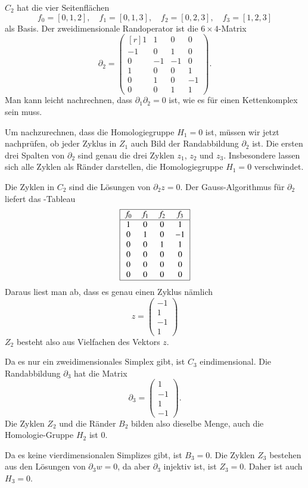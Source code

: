 \begin{beispiel}
$C_2$ hat die vier Seitenflächen
\[
f_0=[0,1,2],\quad
f_1=[0,1,3],\quad
f_2=[0,2,3],\quad
f_3=[1,2,3]
\]
als Basis.
Der zweidimensionale Randoperator ist die $6\times 4$-Matrix 
\[
\partial_2
=
\begin{pmatrix*}[r]
 1& 1& 0& 0\\
-1& 0& 1& 0\\
 0&-1&-1& 0\\
 1& 0& 0& 1\\
 0& 1& 0&-1\\
 0& 0& 1& 1
\end{pmatrix*}.
\]
Man kann leicht nachrechnen, dass $\partial_1\partial_2=0$ ist, wie es
für einen Kettenkomplex sein muss.

Um nachzurechnen, dass die Homologiegruppe $H_1=0$ ist, müssen wir jetzt 
nachprüfen, ob jeder Zyklus in $Z_1$ auch Bild der Randabbildung $\partial_2$
ist.
Die ersten drei Spalten von $\partial_2$ sind genau die drei Zyklen
$z_1$, $z_2$ und $z_3$.
Insbesondere lassen sich alle Zyklen als Ränder darstellen, die
Homologiegruppe $H_1=0$ verschwindet.

Die Zyklen in $C_2$ sind die Lösungen von $\partial_2z=0$.
Der Gauss-Algorithmus für $\partial_2$ liefert das -Tableau
\[
\begin{tabular}{|>{$}c<{$}>{$}c<{$}>{$}c<{$}>{$}c<{$}|}
\hline
f_0&f_1&f_2&f_3\\
\hline
1&0&0& 1\\
0&1&0&-1\\
0&0&1& 1\\
0&0&0& 0\\
0&0&0& 0\\
0&0&0& 0\\
\hline
\end{tabular}
\]
Daraus liest man ab, dass es genau einen Zyklus nämlich
\[
z
=
\begin{pmatrix}
-1\\1\\-1\\1
\end{pmatrix}
\]
$Z_2$ besteht also aus Vielfachen des Vektors $z$.

Da es nur ein zweidimensionales Simplex gibt, ist $C_3$ eindimensional.
Die Randabbildung $\partial_3$ hat die Matrix
\[
\partial_3
=
\begin{pmatrix}
1\\
-1\\
1\\
-1
\end{pmatrix}.
\]
Die Zyklen $Z_2$ und die Ränder $B_2$ bilden also dieselbe Menge, auch
die Homologie-Gruppe $H_2$ ist $0$.

Da es keine vierdimensionalen Simplizes gibt, ist $B_3=0$.
Die Zyklen $Z_3$ bestehen aus den Lösungen von $\partial_3w=0$, da
aber $\partial_3$ injektiv ist, ist $Z_3=0$.
Daher ist auch $H_3=0$.
\end{beispiel}

